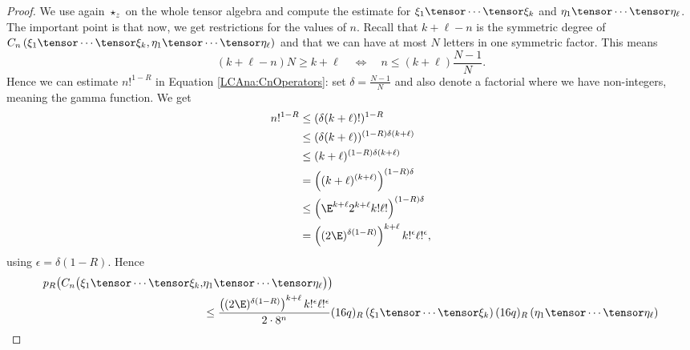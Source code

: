 \begin{proof}
    We use again $\star_z$ on the whole tensor algebra and compute the 
    estimate for $\xi_1 \tensor \cdots \tensor \xi_k$ and $\eta_1 \tensor \cdots 
    \tensor \eta_\ell$. The important point is that now, we get restrictions for 
    the values of $n$. Recall that $k + \ell - n$ is the symmetric degree of 
    $C_n \left( \xi_1 \tensor \cdots \tensor \xi_k, \eta_1 \tensor \cdots 
    \tensor \eta_\ell \right)$ and that we can have at most $N$ letters in one
    symmetric factor. This means
    \begin{equation*}
	    	(k + \ell - n) N
    		\geq
    		k + \ell
    		\quad 
    		\Longleftrightarrow 
    		\quad
    		n 
    		\leq
    		(k + \ell)
    		\frac{N - 1}{N}.
    \end{equation*}
    Hence we can estimate $n!^{1-R}$ in Equation \eqref{LCAna:CnOperators}: set 
    $\delta = \frac{N - 1}{N}$ and also denote a factorial where we have 
    non-integers, meaning the gamma function. We get
    \begin{align*}
        n!^{1-R}
        & \leq
        (\delta (k + \ell)!)^{1 - R}
        \\
        & \leq
        (\delta (k + \ell))^{(1 - R) \delta (k + \ell)}
        \\
        & \leq
        (k + \ell)^{(1 - R) \delta (k + \ell)}
        \\
        & =
        \left(
            (k + \ell)^{(k + \ell)}
        \right)^{(1 - R) \delta}
        \\
        & \leq
        \left(
            \E^{k + \ell} 2^{k + \ell} k! \ell!
        \right)^{(1-R) \delta}
        \\
        & =
        \left( (2 \E)^{\delta (1-R)} \right)^{k + \ell}
        k!^{\epsilon} \ell!^{\epsilon},
    \end{align*}
    using $\epsilon = \delta (1 - R)$. Hence
    \begin{align*}
        p_R \big(
        	C_n \big(
        		\xi_1 \tensor \cdots \tensor \xi_k, 
        &
        		\eta_1 \tensor \cdots \tensor \eta_\ell
        	\big)
        \big)
        \\
        & \leq
        \frac{
        	\left(
        		(2 \E)^{\delta (1 - R)}
        	\right)^{k + \ell}
        	k!^{\epsilon}
        	\ell!^{\epsilon}
        }{2 \cdot 8^n}
        (16 q)_R \left( \xi_1 \tensor \cdots \tensor \xi_k \right)
        (16 q)_R \left( \eta_1 \tensor \cdots \tensor \eta_\ell \right)
        \\

\end{align*}
\end{proof}
